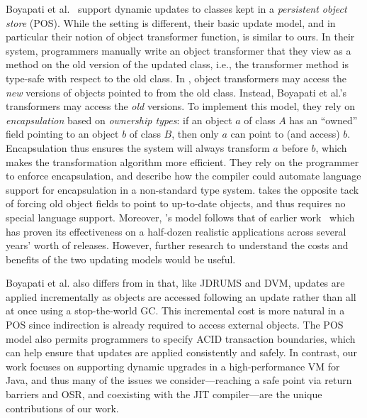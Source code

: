 Boyapati et al.~\cite{boyapati03lazy} support dynamic updates to
classes kept in a \emph{persistent object store} (POS).  While the
setting is different, their basic update model, and in particular
their notion of object transformer function, is similar to ours.  In
their system, programmers manually write an object transformer
that they view as a method on the old version of the updated class, i.e., the transformer method is type-safe with respect to the old class.
In \DSU, object transformers may access the \emph{new} versions of
objects pointed to from the old class.  Instead, Boyapati et al.'s
transformers may access the \emph{old} versions.  To implement this
model, they rely on
\emph{encapsulation} based on \emph{ownership types}: if an object $a$ of class $A$ has an ``owned''
field pointing to an object $b$ of class $B$, then only $a$ can point
to (and access) $b$.  Encapsulation thus ensures the system will always transform $a$ before $b$, which makes the transformation
algorithm more efficient.  They rely on the programmer to 
enforce encapsulation, and describe how the compiler could automate language support for encapsulation in a non-standard type system.  
\DSU{} takes the opposite tack of forcing old object fields to point
to up-to-date objects, and thus requires no special language support.
Moreover, \DSU's model follows that of earlier
work~\cite{k42usenix,neamtiu06dsu,neamtiu09stump,upstare} which has
proven its effectiveness on a half-dozen realistic applications
across several years' worth of releases.  However, further
research to understand the costs and benefits of the two updating
models would be useful.

Boyapati et al. also differs from \DSU{} in that, like JDRUMS and DVM,
updates are applied incrementally as objects are accessed following
an update rather than all at once using a stop-the-world GC\@.  This
incremental cost is more natural in a POS since indirection is
already required to access external objects.  The POS model also
permits programmers to specify ACID transaction boundaries, which can
help ensure that updates are applied consistently and safely.  In contrast, our work focuses on 
supporting dynamic upgrades in a high-performance VM for Java, and thus many of
the issues we consider---reaching a safe point via return barriers and
OSR, and coexisting with the JIT compiler---are the unique
contributions of our work.

% 

